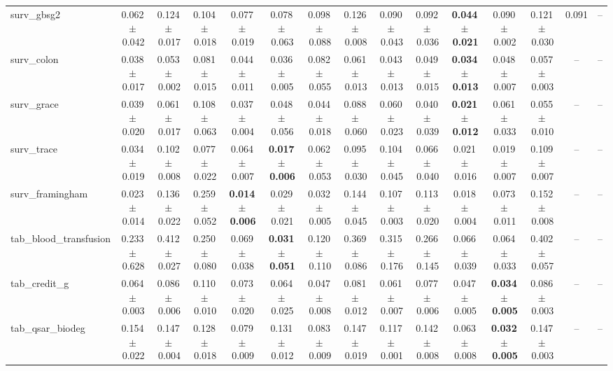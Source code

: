 \documentclass[8pt]{extarticle}
\begin{document}
\begin{longtable}{l*{14}{c}}
surv\_gbsg2 & 0.062\,$\pm$\,0.042 & 0.124\,$\pm$\,0.017 & 0.104\,$\pm$\,0.018 & 0.077\,$\pm$\,0.019 & 0.078\,$\pm$\,0.063 & 0.098\,$\pm$\,0.088 & 0.126\,$\pm$\,0.008 & 0.090\,$\pm$\,0.043 & 0.092\,$\pm$\,0.036 & \textbf{0.044\,$\pm$\,0.021} & 0.090\,$\pm$\,0.002 & 0.121\,$\pm$\,0.030 & 0.091 & -- \\
surv\_colon & 0.038\,$\pm$\,0.017 & 0.053\,$\pm$\,0.002 & 0.081\,$\pm$\,0.015 & 0.044\,$\pm$\,0.011 & 0.036\,$\pm$\,0.005 & 0.082\,$\pm$\,0.055 & 0.061\,$\pm$\,0.013 & 0.043\,$\pm$\,0.013 & 0.049\,$\pm$\,0.015 & \textbf{0.034\,$\pm$\,0.013} & 0.048\,$\pm$\,0.007 & 0.057\,$\pm$\,0.003 & -- & -- \\
surv\_grace & 0.039\,$\pm$\,0.020 & 0.061\,$\pm$\,0.017 & 0.108\,$\pm$\,0.063 & 0.037\,$\pm$\,0.004 & 0.048\,$\pm$\,0.056 & 0.044\,$\pm$\,0.018 & 0.088\,$\pm$\,0.060 & 0.060\,$\pm$\,0.023 & 0.040\,$\pm$\,0.039 & \textbf{0.021\,$\pm$\,0.012} & 0.061\,$\pm$\,0.033 & 0.055\,$\pm$\,0.010 & -- & -- \\
surv\_trace & 0.034\,$\pm$\,0.019 & 0.102\,$\pm$\,0.008 & 0.077\,$\pm$\,0.022 & 0.064\,$\pm$\,0.007 & \textbf{0.017\,$\pm$\,0.006} & 0.062\,$\pm$\,0.053 & 0.095\,$\pm$\,0.030 & 0.104\,$\pm$\,0.045 & 0.066\,$\pm$\,0.040 & 0.021\,$\pm$\,0.016 & 0.019\,$\pm$\,0.007 & 0.109\,$\pm$\,0.007 & -- & -- \\
surv\_framingham & 0.023\,$\pm$\,0.014 & 0.136\,$\pm$\,0.022 & 0.259\,$\pm$\,0.052 & \textbf{0.014\,$\pm$\,0.006} & 0.029\,$\pm$\,0.021 & 0.032\,$\pm$\,0.005 & 0.144\,$\pm$\,0.045 & 0.107\,$\pm$\,0.003 & 0.113\,$\pm$\,0.020 & 0.018\,$\pm$\,0.004 & 0.073\,$\pm$\,0.011 & 0.152\,$\pm$\,0.008 & -- & -- \\
tab\_blood\_transfusion & 0.233\,$\pm$\,0.628 & 0.412\,$\pm$\,0.027 & 0.250\,$\pm$\,0.080 & 0.069\,$\pm$\,0.038 & \textbf{0.031\,$\pm$\,0.051} & 0.120\,$\pm$\,0.110 & 0.369\,$\pm$\,0.086 & 0.315\,$\pm$\,0.176 & 0.266\,$\pm$\,0.145 & 0.066\,$\pm$\,0.039 & 0.064\,$\pm$\,0.033 & 0.402\,$\pm$\,0.057 & -- & -- \\
tab\_credit\_g & 0.064\,$\pm$\,0.003 & 0.086\,$\pm$\,0.006 & 0.110\,$\pm$\,0.010 & 0.073\,$\pm$\,0.020 & 0.064\,$\pm$\,0.025 & 0.047\,$\pm$\,0.008 & 0.081\,$\pm$\,0.012 & 0.061\,$\pm$\,0.007 & 0.077\,$\pm$\,0.006 & 0.047\,$\pm$\,0.005 & \textbf{0.034\,$\pm$\,0.005} & 0.086\,$\pm$\,0.003 & -- & -- \\
tab\_qsar\_biodeg & 0.154\,$\pm$\,0.022 & 0.147\,$\pm$\,0.004 & 0.128\,$\pm$\,0.018 & 0.079\,$\pm$\,0.009 & 0.131\,$\pm$\,0.012 & 0.083\,$\pm$\,0.009 & 0.147\,$\pm$\,0.019 & 0.117\,$\pm$\,0.001 & 0.142\,$\pm$\,0.008 & 0.063\,$\pm$\,0.008 & \textbf{0.032\,$\pm$\,0.005} & 0.147\,$\pm$\,0.003 & -- & -- \\

\end{longtable}
\end{document}
